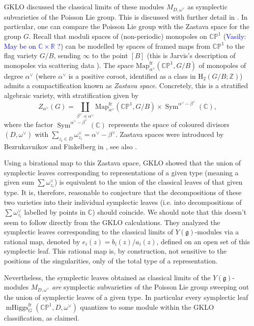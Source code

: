 \documentclass[11pt, oneside, reqno]{amsart}
\theoremstyle{definition} \newtheorem{definition}{Definition}[section]
\theoremstyle{definition} \newtheorem{remark}[definition]{Remark}
\theoremstyle{definition} \newtheorem{remarks}[definition]{Remarks}
\theoremstyle{definition} \newtheorem{question}[definition]{Question}
\theoremstyle{definition} \newtheorem*{note}{Note}
\theoremstyle{definition} \newtheorem{example}[definition]{Example}
\theoremstyle{definition} \newtheorem{examples}[definition]{Examples}
\renewcommand{\gg}{\mathfrak{g}}
\newcommand{\bb}[1]{\mathbb{#1}}
\newcommand{\mr}[1]{\mathrm{#1}}
\newcommand{\CC}{\mathbb{C}}
\newcommand{\ZZ}{\mathbb{Z}}
\DeclareMathOperator{\sym}{Sym}
\DeclareMathOperator{\mhiggs}{mHiggs}
\newcommand{\fr}{\mathrm{fr}}
\newcommand{\vasily}[1]{(\textcolor{blue}{Vasily: #1})}
\begin{document}
GKLO discussed the classical limits of these modules $M_{D,\omega^\vee}$ as symplectic subvarieties of the Poisson Lie group.  This is discussed with further detail in \cite[Section 4]{Shapiro}.  In particular, one can compare the Poisson Lie group with the Zastava space for the group $G$.  Recall that  moduli spaces of (non-periodic) monopoles on $\bb{CP}^1$ \vasily{May be on $\mathbb{C} \times \mathbb{R}$ ?} can be modelled by spaces of framed maps from $\bb{CP}^1$ to the flag variety $G/B$, sending $\infty$ to the point $[B]$ (this is Jarvis's description of monopoles via scattering data \cite{Jarvis}).  The space $\mr{Map}_{\alpha^\vee}^\fr(\bb{CP}^1, G/B)$ of monopoles of degree $\alpha^\vee$ (where $\alpha^\vee$ is a positive coroot, identified as a class in $\mr H_2(G/B;\ZZ)$) admits a compactification known as \emph{Zastava space}.  Concretely, this is a stratified algebraic variety, with stratification given by
\[Z_{\alpha^\vee}(G) = \coprod_{\beta^\vee \preceq \alpha^\vee} \mr{Map}_{\alpha^\vee}^\fr(\bb{CP}^1, G/B) \times \sym^{\alpha^\vee - \beta^\vee}(\CC),\]
where the factor $\sym^{\alpha^\vee - \beta^\vee}(\CC)$ represents the space of coloured divisors $(D, \omega^\vee)$ with $\sum_{z_i \in D} \omega^\vee_{z_i} = \alpha^\vee - \beta^\vee$.  Zastava spaces were introduced by Bezrukavnikov and Finkelberg in \cite{BezrukavnikovFinkelbergI}, see also \cite{BravermanICM}.

Using a birational map to this Zastava space, GKLO showed that the union of symplectic leaves corresponding to representations of a given type (meaning a given sum $\sum \omega^\vee_{z_i}$) is equivalent to the union of the classical leaves of that given type.  It is, therefore, reasonable to conjecture that the decompositions of these two varieties into their individual symplectic leaves (i.e. into decompositions of $\sum \omega^\vee_{z_i}$ labelled by points in $\CC$) should coincide.  We should note that this doesn't seem to follow directly from the GKLO calculations.  They analyzed the symplectic leaves corresponding to the classical limits of $Y(\gg)$-modules via a rational map, denoted by $e_i(z) = b_i(z)/a_i(z)$, defined on an open set of this symplectic leaf.  This rational map is, by construction, not sensitive to the positions of the singularities, only of the total type of a representation.

Nevertheless, the symplectic leaves obtained as classical limits of the $Y(\gg)$-modules $M_{D,\omega^\vee}$ \emph{are} symplectic subvarieties of the Poisson Lie group sweeping out the union of symplectic leaves of a given type.  In particular every symplectic leaf $\mhiggs^\fr_G(\bb{CP}^1,D,\omega^\vee)$ quantizes to some module within the GKLO classification, as claimed.
\end{document}
